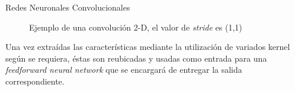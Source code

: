 \documentclass[handout, 9pt]{beamer}
\begin{document}
\begin{frame}{Redes Neuronales Convolucionales}

\begin{figure}[H]
    \centering
    \caption{Ejemplo de una convolución 2-D, el valor de \textit{stride} es (1,1) \cite{Goodfellow-et-al-2016}}
\end{figure} \pause 

Una vez extraídas las características mediante la utilización de variados kernel según se requiera, éstas son reubicadas y usadas como entrada para una \textit{feedforward neural network} que se encargará de entregar la salida  correspondiente. 

\end{frame}
\end{document}
